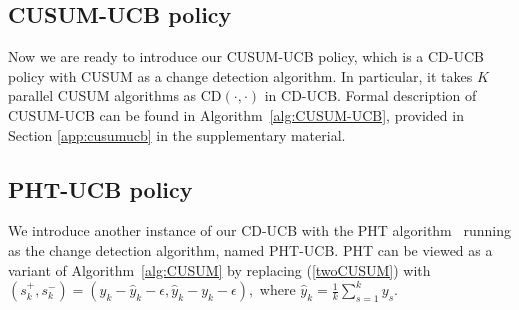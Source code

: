 \documentclass[letterpaper]{article} %
\newcommand{\blue}{}
\begin{document}
\subsection{CUSUM-UCB policy}

Now we are ready to introduce our CUSUM-UCB policy, which is a CD-UCB policy with CUSUM as a change detection algorithm. In particular, it takes $K$ parallel CUSUM algorithms as CD$(\cdot,\cdot)$ in CD-UCB. Formal description of CUSUM-UCB can be found in Algorithm~\ref{alg:CUSUM-UCB}, provided in Section \ref{app:cusumucb} in the supplementary material. %

\subsection{PHT-UCB policy}
We introduce another instance of our CD-UCB with the PHT algorithm~\cite{hinkley1971inference} running as the change detection algorithm, named PHT-UCB. PHT can be viewed as a variant of Algorithm~\ref{alg:CUSUM} by replacing (\ref{twoCUSUM}) with $(s_{k}^+,s_{k}^-)=(y_k-\hat{y}_k-\epsilon,\hat{y}_k-y_k-\epsilon),$
where $\hat{y}_k=\frac{1}{k}\sum_{s=1}^ky_s$.
\end{document}
